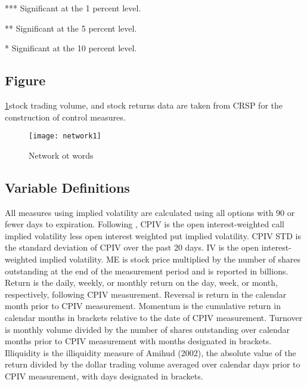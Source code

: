 \begin{table}[h]
\begin{threeparttable}
\begin{subtable}[t]{\linewidth}
\begin{tabular}{|c|cccccccccccccc}
\end{tabular}

\begin{tablenotes}
\item
\item[***]Significant at the 1 percent level.    
\item[**]Significant at the 5 percent level.   
\item[*]Significant at the 10 percent level.
\end{tablenotes}

\end{subtable}
\end{threeparttable}

\end{table}




\subsection{Figure}
\ref{fig:Network}stock trading volume, and stock returns data are taken from CRSP for the construction of control measures.

\begin{figure}[h]
\centering
\texttt{[image: network1]}
\caption{Network ot words}
\label{fig:Network}
\end{figure}


\subsection{Variable Definitions}
All measures using implied volatility are calculated using all options with 90 or fewer days to expiration. Following \textcite{cremers2010deviations}, CPIV is the open interest-weighted call implied volatility less open interest weighted put implied volatility. CPIV STD is the standard deviation of CPIV over the past 20 days. IV is the open interest-weighted implied volatility. ME is stock price multiplied by the number of shares outstanding at the end of the measurement period and is reported in billions. Return is the daily, weekly, or monthly return on the day, week, or month, respectively, following CPIV measurement. Reversal is return in the calendar month prior to CPIV measurement. Momentum is the cumulative return in calendar months in brackets relative to the date of CPIV measurement. Turnover is monthly 
volume divided by the number of shares outstanding over calendar months prior to CPIV measurement with months designated in brackets. Illiquidity is the illiquidity measure of Amihud (2002), the absolute value of the return divided by the dollar trading volume averaged over calendar days prior to CPIV measurement, with days designated in brackets.

